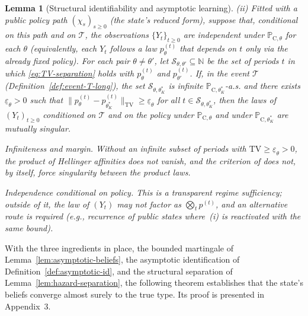\documentclass[ecta,nameyear,draft]{econsocart}
\theoremstyle{plain}
\newtheorem{lemma}[theorem]{Lemma}
\theoremstyle{definition}
\newcommand{\ProbC}[1]{\mathbb{P}_{\mathrm{C},#1}}
\newcommand{\1}{\mathbf{1}}
\begin{document}
\begin{lemma}[Structural identifiability and asymptotic learning]
\medskip
\noindent\textup{(ii)}
Fitted with a public policy path $(\chi_s)_{s\ge 0}$ \textup{(}the state's reduced form\textup{)}, suppose that, conditional on this path and on $\mathcal{T}$, the observations $\{Y_t\}_{t\ge 0}$ are independent under $\ProbC{\theta}$ for each $\theta$ \textup{(}equivalently, each $Y_t$ follows a law $p_\theta^{(t)}$ that depends on $t$ only via the already fixed policy\textup{)}. For each pair $\theta\neq\theta'$, let $\mathcal{S}_{\theta,\theta'}\subseteq\mathbb{N}$ be the set of periods $t$ in which \eqref{eq:TV-separation} holds with $p_\theta^{(t)}$ and $p_{\theta'}^{(t)}$. If, in the event $\mathcal{T}$ \textup{(}Definition~\ref{def:event-T-long}\textup{)}, the set $\mathcal{S}_{\theta,\theta_K^\ast}$ is infinite $\ProbC{\theta_K^\ast}$-a.s. and there exists $\underline{\varepsilon}_{\theta}>0$ such that $\|p_\theta^{(t)}-p_{\theta_K^\ast}^{(t)}\|_{\mathrm{TV}}\ge \underline{\varepsilon}_{\theta}$ for all $t\in\mathcal{S}_{\theta,\theta_K^\ast}$, then the laws of $(Y_t)_{t\ge 0}$ conditioned on $\mathcal{T}$ and on the policy under $\ProbC{\theta}$ and under $\ProbC{\theta_K^\ast}$ are mutually singular.

\medskip
\begin{list}{}{%
  \setlength{\leftmargin}{2.25em}%
  \setlength{\labelwidth}{2.25em}%
  \setlength{\labelsep}{0.45em}%
  \setlength{\itemsep}{0.35em}%
  \setlength{\parsep}{0pt}%
  \setlength{\topsep}{0.25em}%
}
\item[\textup{(C3)}] \textup{Infiniteness and margin.}\quad
Without an infinite subset of periods with $\mathrm{TV}\ge\underline{\varepsilon}_\theta>0$, the product of Hellinger affinities does not vanish, and the criterion of \citet{Kakutani1948} does not, by itself, force singularity between the product laws.
\item[\textup{(C4)}] \textup{Independence conditional on policy.}\quad
This is a transparent regime sufficiency; outside of it, the law of $(Y_t)$ may not factor as $\bigotimes_t p^{(t)}$, and an alternative route is required \textup{(}e.g., recurrence of public states where~\textup{(i)} is reactivated with the same bound\textup{)}.
\end{list}
\end{lemma}

With the three ingredients in place, the bounded martingale of Lemma~\ref{lem:asymptotic-beliefs}, the asymptotic identification of Definition~\ref{def:asymptotic-id}, and the structural separation of Lemma~\ref{lem:hazard-separation}, the following theorem establishes that the state's beliefs converge almost surely to the true type. Its proof is presented in Appendix~3.
\end{document}
